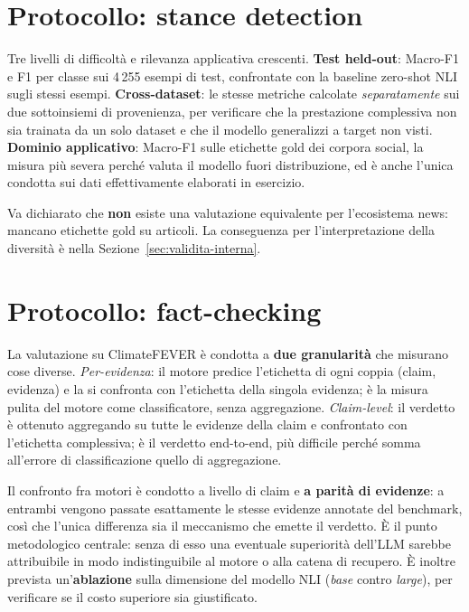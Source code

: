 \documentclass[11pt,a4paper]{report}
\begin{document}
\section{Protocollo: stance detection}\label{sec:proto-stance}
Tre livelli di difficoltà e rilevanza applicativa crescenti. \textbf{Test held-out}: Macro-F1 e F1
per classe sui 4\,255 esempi di test, confrontate con la baseline zero-shot NLI sugli stessi
esempi. \textbf{Cross-dataset}: le stesse metriche calcolate \emph{separatamente} sui due
sottoinsiemi di provenienza, per verificare che la prestazione complessiva non sia trainata da un
solo dataset e che il modello generalizzi a target non visti. \textbf{Dominio applicativo}:
Macro-F1 sulle etichette gold dei corpora social, la misura più severa perché valuta il modello
fuori distribuzione, ed è anche l'unica condotta sui dati effettivamente elaborati in esercizio.

Va dichiarato che \textbf{non} esiste una valutazione equivalente per l'ecosistema news: mancano
etichette gold su articoli. La conseguenza per l'interpretazione della diversità è nella
Sezione~\ref{sec:validita-interna}.

\section{Protocollo: fact-checking}\label{sec:proto-fc}
La valutazione su ClimateFEVER è condotta a \textbf{due granularità} che misurano cose diverse.
\emph{Per-evidenza}: il motore predice l'etichetta di ogni coppia (claim, evidenza) e la si
confronta con l'etichetta della singola evidenza; è la misura pulita del motore come
classificatore, senza aggregazione. \emph{Claim-level}: il verdetto è ottenuto aggregando su tutte
le evidenze della claim e confrontato con l'etichetta complessiva; è il verdetto end-to-end, più
difficile perché somma all'errore di classificazione quello di aggregazione.

Il confronto fra motori è condotto a livello di claim e \textbf{a parità di evidenze}: a entrambi
vengono passate esattamente le stesse evidenze annotate del benchmark, così che l'unica differenza
sia il meccanismo che emette il verdetto. È il punto metodologico centrale: senza di esso una
eventuale superiorità dell'LLM sarebbe attribuibile in modo indistinguibile al motore o alla
catena di recupero. È inoltre prevista un'\textbf{ablazione} sulla dimensione del modello NLI
(\emph{base} contro \emph{large}), per verificare se il costo superiore sia giustificato.
\end{document}
